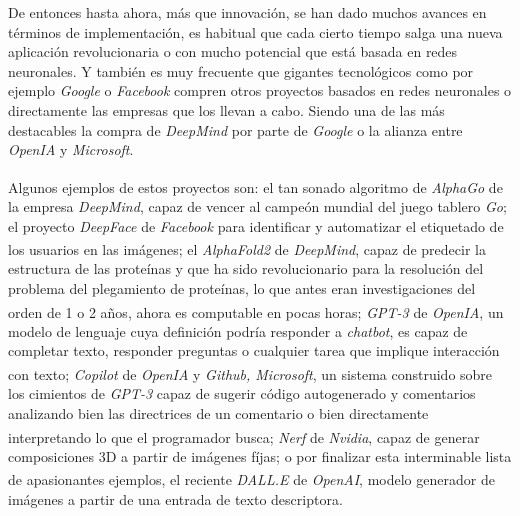 De entonces hasta ahora, más que innovación, se han dado muchos avances
en términos de implementación, es habitual que cada cierto tiempo salga
una nueva aplicación revolucionaria o con mucho potencial que está basada
en redes neuronales. Y también es muy frecuente que gigantes tecnológicos
como por ejemplo \textit{Google} o \textit{Facebook} compren otros
proyectos basados en redes neuronales o directamente las empresas
que los llevan a cabo. Siendo una de las más destacables la compra de
\textit{DeepMind} por parte de \textit{Google} o la alianza entre
\textit{OpenIA} y \textit{Microsoft}.


Algunos ejemplos de estos proyectos son:
el tan sonado algoritmo de \textit{AlphaGo}\textsuperscript{\cite{alphago}}
de la empresa \textit{DeepMind},
capaz de vencer al campeón mundial del juego tablero \textit{Go}; el
proyecto \textit{DeepFace} de \textit{Facebook} para identificar y automatizar
el etiquetado de los usuarios en las imágenes; el \textit{AlphaFold2}
\textsuperscript{\cite{alphafold}} de
\textit{DeepMind}, capaz de predecir la estructura de las proteínas y que
ha sido revolucionario para la resolución del problema del plegamiento de
proteínas, lo que antes eran investigaciones del orden de 1 o 2 años, ahora
es computable en pocas horas; \textit{GPT-3}
\textsuperscript{\cite{openai}} de \textit{OpenIA},
un modelo de lenguaje cuya definición podría responder a \textit{chatbot},
es capaz de completar texto, responder preguntas o cualquier tarea que
implique interacción con texto; \textit{Copilot}\textsuperscript{\cite{ghcopilot}}
de \textit{OpenIA}
y \textit{Github, Microsoft}, un sistema construido sobre los cimientos de
\textit{GPT-3} capaz de sugerir código autogenerado
y comentarios analizando bien las directrices de un comentario o bien
directamente interpretando lo que el programador busca; \textit{Nerf}\textsuperscript{\cite{nerfs}}
de \textit{Nvidia}, capaz de generar composiciones 3D a partir de
imágenes fíjas; o por finalizar esta interminable lista de apasionantes
ejemplos, el reciente \textit{DALL.E}\textsuperscript{\cite{openai}} de \textit{OpenAI}, modelo generador
de imágenes a partir de una entrada de texto descriptora.

